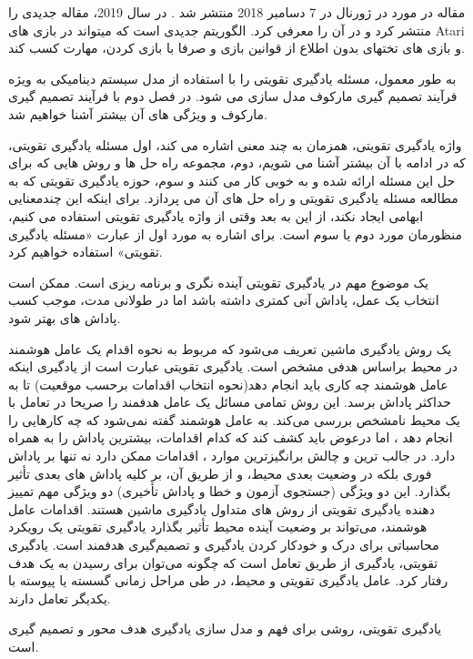 مقاله
  در مورد
    در ژورنال
در 7 دسامبر 2018 منتشر شد
\cite{silver2018general}.
در سال 2019،
مقاله جدیدی را منتشر کرد و در آن
را معرفی کرد. 
الگوریتم جدیدی است که می\nf تواند در بازی های Atari و بازی های تخته\nf ای 
 بدون اطلاع از قوانین بازی و صرفا با بازی کردن، مهارت کسب کند.


به طور معمول، مسئله یادگیری تقویتی را با استفاده از مدل سیستم دینامیکی به ویژه فرآیند تصمیم گیری مارکوف مدل سازی می شود. در فصل دوم با فرآیند تصمیم گیری مارکوف و ویژگی های آن بیشتر آشنا خواهیم شد.

واژه یادگیری تقویتی، همزمان به چند معنی اشاره می کند، اول مسئله یادگیری تقویتی، که در ادامه با آن بیشتر آشنا می شویم،  دوم، مجموعه راه حل ها و روش هایی که برای حل این مسئله ارائه شده و به خوبی کار می کنند و سوم، حوزه یادگیری تقویتی که به مطالعه مسئله یادگیری تقویتی و راه حل های آن می پردازد. برای اینکه این چندمعنایی ابهامی ایجاد نکند، از این به بعد وقتی از واژه یادگیری تقویتی استفاده می کنیم، منظورمان  مورد دوم یا سوم است. برای اشاره به مورد اول از عبارت «مسئله یادگیری تقویتی» استفاده خواهیم کرد. 

یک موضوع مهم در یادگیری تقویتی آینده نگری و برنامه ریزی است. ممکن است انتخاب یک عمل، پاداش آنی کمتری داشته باشد اما در طولانی مدت، موجب کسب پاداش های بهتر شود. 

یک روش یادگیری ماشین تعریف می‌شود که مربوط به نحوه اقدام یک عامل هوشمند  در محیط براساس هدفی مشخص است. یادگیری تقویتی عبارت است از یادگیری اینکه عامل هوشمند چه کاری باید انجام دهد(نحوه انتخاب اقدامات برحسب موقعیت) تا به حداکثر پاداش برسد. این روش تمامی‌ مسائل یک عامل هدفمند را صریحا در تعامل با یک محیط نامشخص بررسی می‌کند. به عامل هوشمند گفته نمی‌شود که چه کارهایی را انجام دهد ، اما درعوض باید کشف کند که کدام اقدامات، بیشترین پاداش را به همراه دارد. در جالب ترین و چالش برانگیزترین موارد ، اقدامات ممکن دارد نه تنها بر پاداش فوری بلکه در وضعیت بعدی محیط، و از طریق آن، بر کلیه پاداش های بعدی تأثیر بگذارد. این دو ویژگی (جستجوی آزمون و خطا و پاداش تأخیری) دو ویژگی مهم تمییز دهنده یادگیری تقویتی از روش های متداول یادگیری ماشین هستند.
اقدامات عامل هوشمند، می‌تواند بر وضعیت آینده محیط تأثیر بگذارد
یادگیری تقویتی یک رویکرد محاسباتی برای درک و خودکار کردن یادگیری و تصمیم‌گیری هدفمند است.
یادگیری تقویتی، یادگیری از  طریق تعامل است که چگونه می‌توان برای رسیدن به یک هدف رفتار کرد.
عامل یادگیری تقویتی و محیط، در طی مراحل زمانی گسسته یا پیوسته با یکدیگر تعامل دارند.

یادگیری تقویتی، روشی برای فهم و مدل سازی یادگیری هدف محور و تصمیم گیری است.

